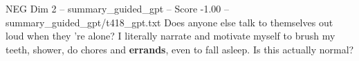 \begin{textsample}{NEG Dim 2 – summary\_guided\_gpt – Score -1.00 – summary\_guided\_gpt/t418\_gpt.txt}  \label{ex:f2_neg_031}
Does anyone else talk to themselves out loud when they ’re alone?
I literally narrate and motivate myself to brush my teeth, shower, do chores and \textbf{errands}, even to fall asleep.
Is this actually normal?

\end{textsample}
